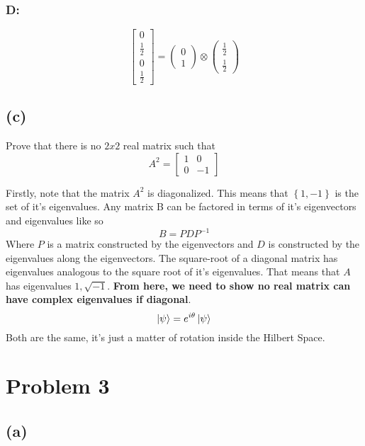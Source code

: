 \documentclass[]{article}
\begin{document}
\hypertarget{d-1}{%
\subsubsection{D:}\label{d-1}}

\[
\begin{bmatrix} 
0 \\
\frac{1}{2} \\
0 \\
\frac{1}{2}
\end{bmatrix}=\begin{pmatrix}
0 \\
1
\end{pmatrix}\otimes \begin{pmatrix}
\frac{1}{2} \\
\frac{1}{2}
\end{pmatrix}
\]

\hypertarget{c-2}{%
\subsection{(c)}\label{c-2}}

Prove that there is no \(2x2\) real matrix such that \[
A^{2} = \begin{bmatrix}
1 & 0 \\
0 & -1
\end{bmatrix}
\]

Firstly, note that the matrix \(A^{2}\) is diagonalized. This means that
\(\left\{ 1,-1 \right\}\) is the set of it's eigenvalues. Any matrix B
can be factored in terms of it's eigenvectors and eigenvalues like so \[
B = PDP^{-1}
\] Where \(P\) is a matrix constructed by the eigenvectors and \(D\) is
constructed by the eigenvalues along the eigenvectors. The square-root
of a diagonal matrix has eigenvalues analogous to the square root of
it's eigenvalues. That means that \(A\) has eigenvalues
\(1,\sqrt{ -1 }\). \textbf{From here, we need to show no real matrix can
have complex eigenvalues if diagonal}. \[
\ket{\psi}  = e^{ i\theta }\ket{\psi} 
\] Both are the same, it's just a matter of rotation inside the Hilbert
Space.

\hypertarget{problem-3}{%
\section{Problem 3}\label{problem-3}}

\hypertarget{a-3}{%
\subsection{(a)}\label{a-3}}
\end{document}
